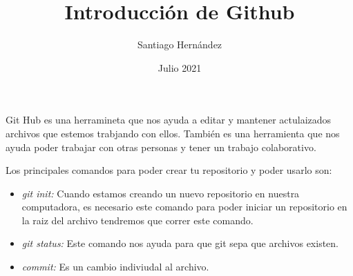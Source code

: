 \documentclass[a4paper,12pt]{article}
\title{\vspace{-3.5cm}Introducción de Github}
\author{\vspace{-6mm}Santiago Hernández}
\date{\vspace{-5mm}Julio 2021}
\begin{document}
  \maketitle
  Git Hub es una herramineta que nos ayuda a editar y mantener actulaizados archivos que estemos trabjando con ellos. También es una herramienta que nos ayuda poder trabajar con otras personas y tener un trabajo colaborativo.

  Los principales comandos para poder crear tu repositorio y poder usarlo son:

 \begin{itemize}
   \item \textit{git init:} Cuando estamos creando un nuevo repositorio en nuestra computadora, es necesario este comando para poder iniciar un repositorio en la raiz del archivo tendremos que correr este comando.
   \item \textit{git status:} Este comando nos ayuda para que git sepa que archivos existen.
   \item \textit{commit:} Es un cambio indiviudal al archivo.
 \end{itemize}
\end{document}
